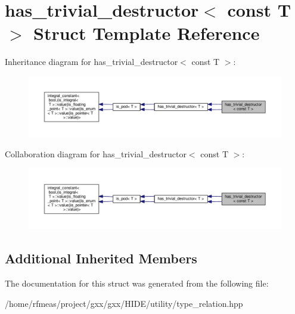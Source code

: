 \hypertarget{structhas__trivial__destructor_3_01const_01T_01_4}{}\section{has\+\_\+trivial\+\_\+destructor$<$ const T $>$ Struct Template Reference}
\label{structhas__trivial__destructor_3_01const_01T_01_4}


Inheritance diagram for has\+\_\+trivial\+\_\+destructor$<$ const T $>$\+:
\nopagebreak
\begin{figure}[H]
\begin{center}
\leavevmode
\includegraphics[width=350pt]{structhas__trivial__destructor_3_01const_01T_01_4__inherit__graph}
\end{center}
\end{figure}


Collaboration diagram for has\+\_\+trivial\+\_\+destructor$<$ const T $>$\+:
\nopagebreak
\begin{figure}[H]
\begin{center}
\leavevmode
\includegraphics[width=350pt]{structhas__trivial__destructor_3_01const_01T_01_4__coll__graph}
\end{center}
\end{figure}
\subsection*{Additional Inherited Members}


The documentation for this struct was generated from the following file\+:\begin{DoxyCompactItemize}
\item 
/home/rfmeas/project/gxx/gxx/\+H\+I\+D\+E/utility/type\+\_\+relation.\+hpp\end{DoxyCompactItemize}
